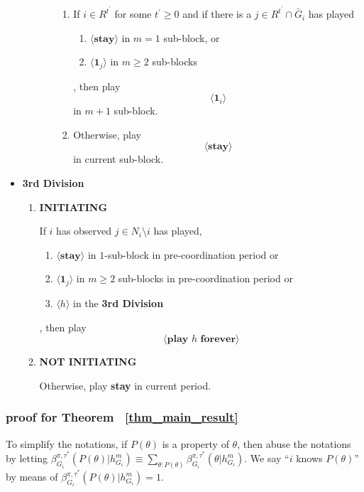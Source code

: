 \documentclass[12pt,letter]{article}
\theoremstyle{definition}
\theoremstyle{remark}
\theoremstyle{claim}
\begin{document}
\begin{itemize}
\begin{itemize}
\begin{itemize}
\begin{enumerate}
\item If $i\in R^{t^{'}}$ for some $t^{'}\geq 0$ and if there is a $j\in R^{t^{'}}\cap \bar{G}_i$ has played 
\begin{enumerate}
\item $\langle \textbf{stay} \rangle$ in $m=1$ sub-block, or
\item $\langle \mathbf{1}_j \rangle$ in $m\geq 2$ sub-blocks
\end{enumerate}
, then play 
\[\langle \mathbf{1}_i \rangle\] in $m+1$ sub-block.
\item Otherwise, play
\[\langle \textbf{stay} \rangle\] in current sub-block.
\end{enumerate}

\end{itemize}

\end{itemize}



\item \textbf{3rd Division} 

\begin{enumerate}
\item \textbf{INITIATING} 

If $i$ has observed $j\in N_i\setminus i$ has played,
\begin{enumerate}
\item $\langle \textbf{stay} \rangle$ in $1$-sub-block in pre-coordination period or
\item $\langle \mathbf{1}_j \rangle$ in $m\geq 2$ sub-blocks in pre-coordination period or
\item $\langle h \rangle$ in the \textbf{3rd Division} 
\end{enumerate}
, then play
\[\langle \textbf{play $h$ forever} \rangle\]
\item \textbf{NOT INITIATING} 

Otherwise, play 
\textbf{stay} 
in current period.
\end{enumerate}
\end{itemize}





\subsubsection{proof for Theorem ~\ref{thm_main_result}}

To simplify the notations, if $P(\theta)$ is a property of $\theta$, then abuse the notations by letting $\beta^{\pi,\tau^*}_{G_i}(P(\theta)|h^{m}_{G_i})\equiv \sum_{\theta:P(\theta)}\beta^{\pi,\tau^*}_{G_i}(\theta|h^{m}_{G_i})$. We say ``$i$ knows $P(\theta)$'' by means of $\beta^{\pi,\tau^*}_{G_i}(P(\theta)|h^{m}_{G_i})=1$.
\end{document}
